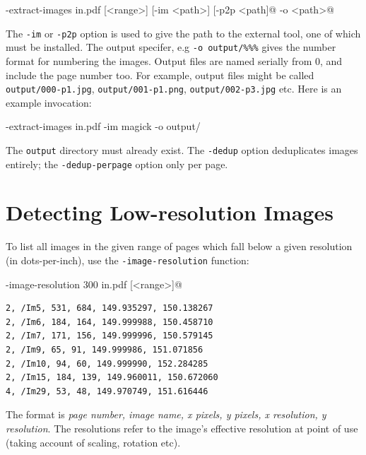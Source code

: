 \documentclass{book}
\begin{document}
  \begin{framed}
  \noindent\small\verb@cpdf -extract-images in.pdf [<range>] [-im <path>] [-p2p <path]@
  \noindent\small{} -o <path>@
  \end{framed}

\noindent The \texttt{-im} or \texttt{-p2p} option is used to give the path to the external tool, one of which must be installed. The output specifer, e.g \verb!-o output/%%%! gives the number format for numbering the images. Output files are named serially from 0, and include the page number too. For example, output files might be called \texttt{output/000-p1.jpg}, \texttt{output/001-p1.png}, \texttt{output/002-p3.jpg} etc. Here is an example invocation:

  \begin{framed}
  \noindent\small\verb@cpdf -extract-images in.pdf -im magick -o output/%%%@
  \end{framed}

\noindent The \texttt{output} directory must already exist. The \texttt{-dedup} option deduplicates images entirely; the \texttt{-dedup-perpage} option only per page.

  \section{Detecting Low-resolution Images}\label{imageres}
  To list all images in the given range of pages which fall below a given resolution (in dots-per-inch), use the \verb!-image-resolution! function:
  \begin{framed}
  \noindent\small\verb@cpdf -image-resolution 300 in.pdf [<range>]@
  \end{framed}

  \begin{framed}
{\small\begin{verbatim}2, /Im5, 531, 684, 149.935297, 150.138267
2, /Im6, 184, 164, 149.999988, 150.458710
2, /Im7, 171, 156, 149.999996, 150.579145
2, /Im9, 65, 91, 149.999986, 151.071856
2, /Im10, 94, 60, 149.999990, 152.284285
2, /Im15, 184, 139, 149.960011, 150.672060
4, /Im29, 53, 48, 149.970749, 151.616446\end{verbatim}}
  \end{framed}
  \noindent The format is \textit{page number, image name, x pixels, y pixels, x resolution, y resolution}. The resolutions refer to the image's effective resolution at point of use (taking account of scaling, rotation etc).
\end{document}
